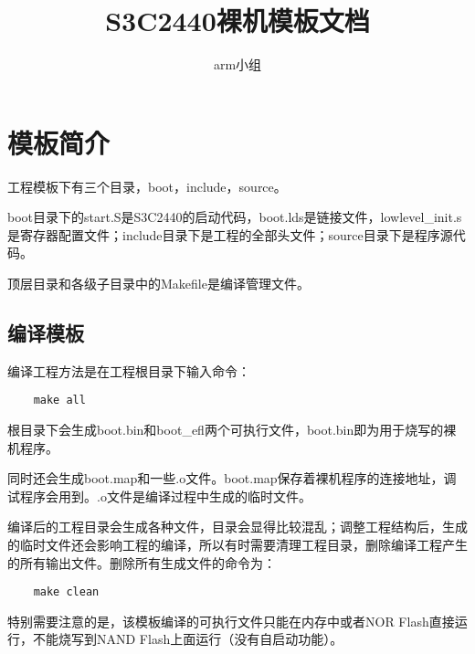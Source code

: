 \documentclass[a4paper,11pt]{article}
\author{arm小组}
\title{S3C2440裸机模板文档}
\begin{document}
\maketitle
\pagestyle{fancy}

\newpage

\section{模板简介}
工程模板下有三个目录，boot，include，source。
\par
boot目录下的start.S是S3C2440的启动代码，boot.lds是链接文件，lowlevel\_init.s是寄存器配置文件；include目录下是工程的全部头文件；source目录下是程序源代码。
\par
顶层目录和各级子目录中的Makefile是编译管理文件。

\subsection{编译模板}
编译工程方法是在工程根目录下输入命令：
\begin{lstlisting}
	make all
\end{lstlisting}
\par
根目录下会生成boot.bin和boot\_efl两个可执行文件，boot.bin即为用于烧写的裸机程序。
\par
同时还会生成boot.map和一些.o文件。boot.map保存着裸机程序的连接地址，调试程序会用到。.o文件是编译过程中生成的临时文件。
\par
编译后的工程目录会生成各种文件，目录会显得比较混乱；调整工程结构后，生成的临时文件还会影响工程的编译，所以有时需要清理工程目录，删除编译工程产生的所有输出文件。删除所有生成文件的命令为：
\begin{lstlisting}
	make clean
\end{lstlisting}
\par
特别需要注意的是，该模板编译的可执行文件只能在内存中或者NOR Flash直接运行，不能烧写到NAND Flash上面运行（没有自启动功能）。
\par

\end{document}
